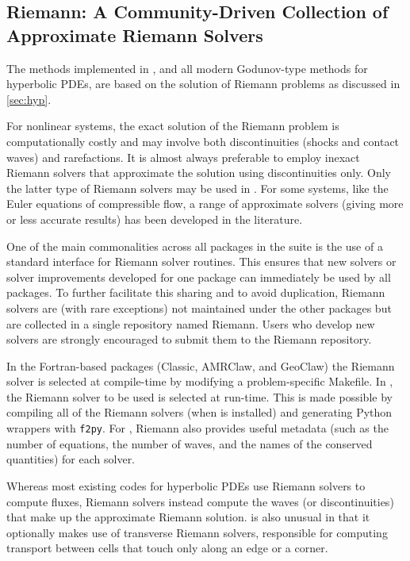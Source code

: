 %
%
%

\subsection{Riemann: A Community-Driven Collection of Approximate Riemann
Solvers}\label{sec:riemann}

The methods implemented in \clawpack, and all modern Godunov-type methods for
hyperbolic PDEs, are based on the solution of Riemann problems as discussed
in \cref{sec:hyp}.  


For nonlinear systems, the exact solution of the Riemann problem is computationally
costly and may involve both discontinuities (shocks and contact waves) and
rarefactions.  It is almost always preferable to employ inexact Riemann solvers
that approximate the solution using discontinuities only.  Only the latter type
of Riemann solvers may be used in \clawpack.  For some systems, like the Euler
equations of compressible flow, a range of approximate solvers (giving 
more or less accurate results) has been developed in the literature.

One of the main commonalities across all packages in the \clawpack suite is the
use of a standard interface for Riemann solver routines.  This ensures that new
solvers or solver improvements developed for one package can immediately
be used by all packages.  To further facilitate this sharing and to avoid 
duplication, Riemann solvers are (with rare exceptions) not maintained under
the other packages but are collected in a single repository named Riemann.
Users who develop new solvers are strongly encouraged to submit them to the
Riemann repository.

In the Fortran-based packages (Classic, AMRClaw, and GeoClaw) the Riemann
solver is selected at compile-time by modifying a problem-specific Makefile.
In \pyclaw, the Riemann solver to be used is selected at run-time.  This is
made possible by compiling all of the Riemann solvers (when \pyclaw is installed)
and generating Python wrappers with \texttt{f2py}.  For \pyclaw, Riemann also provides
useful metadata (such as the number of equations, the number of waves, and
the names of the conserved quantities) for each solver.

Whereas most existing codes for hyperbolic PDEs use Riemann solvers to
compute fluxes, \clawpack Riemann solvers instead compute the waves 
(or discontinuities) that make up the approximate Riemann solution.
\clawpack is also unusual in that it optionally makes use of transverse
Riemann solvers, responsible for computing transport between cells that
touch only along an edge or a corner.
